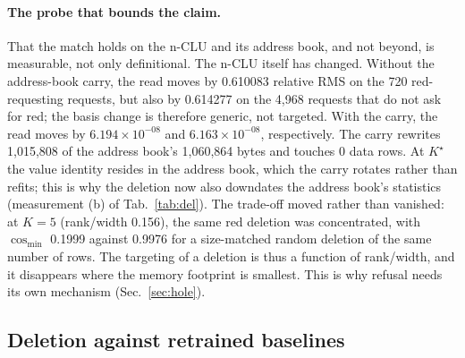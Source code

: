\documentclass{article} %
\newcommand{\sci}[2]{\ensuremath{#1\times10^{#2}}}
\newcommand{\Kstar}{\ensuremath{K^{\star}}}
\begin{document}
\paragraph{The probe that bounds the claim.} That the match holds on the n-CLU and its address book,
and not beyond, is measurable, not only definitional.
The n-CLU itself has changed. Without the address-book carry, the read moves by 0.610083
relative RMS on the 720 red-requesting requests, but also by 0.614277 on the 4,968 requests
that do not ask for red; the basis change is therefore generic, not targeted. With the carry,
the read moves by \sci{6.194}{-08} and \sci{6.163}{-08}, respectively. The carry rewrites
1,015,808 of the address book's 1,060,864 bytes and touches 0 data rows. %
At $\Kstar$ the value identity
resides in the address book, which the carry rotates rather than refits; this is why the deletion
now also downdates the address book's statistics (measurement (b) of Tab.~\ref{tab:del}). The trade-off moved
rather than vanished: at $K=5$ (rank/width 0.156), the same red deletion was concentrated, with
$\cos_{\min}$ 0.1999 against 0.9976 for a size-matched random deletion of the same number of
rows. %
The targeting of a deletion is thus a function of rank/width, and it disappears where the memory footprint
is smallest. This is why refusal needs its own mechanism (Sec.~\ref{sec:hole}).

\subsection{Deletion against retrained baselines}
\label{sec:del-comparators}
\end{document}

